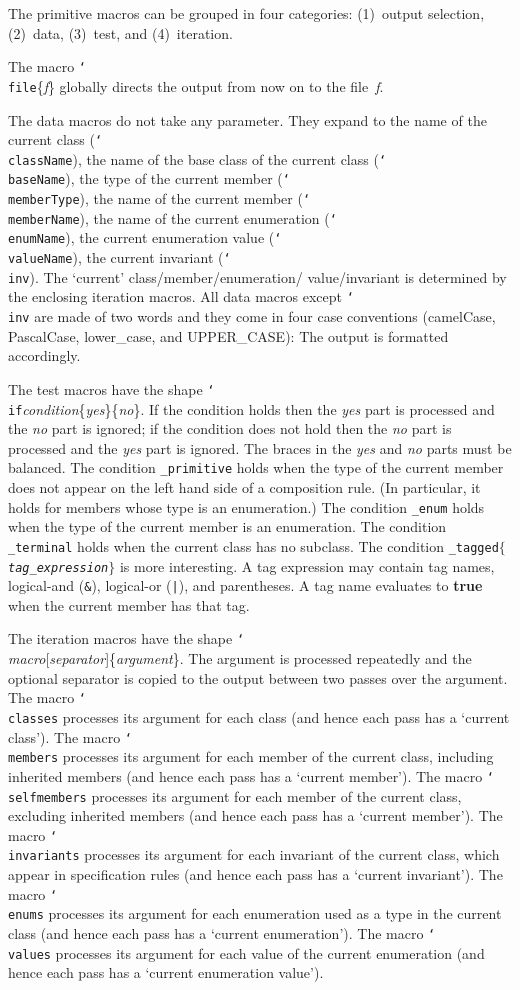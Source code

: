 \documentclass[a4paper]{article}
\newcommand{\macro}[1]{\texttt{\char`\\#1}}
\theoremstyle{slanted}
\theoremstyle{definition}
\theoremstyle{remark}
\begin{document}
The primitive macros can be grouped in four categories:
(1)~output selection, (2)~data, (3)~test, and (4)~iteration.

The macro \macro{file}\{\thinspace\textit{f}\} globally directs
the output from now on to the file~\textit{f}.

The data macros do not take any parameter. They expand to the
name of the current class (\macro{className}), the name of the
base class of the current class (\macro{baseName}), the type
of the current member (\macro{memberType}), the name of the
current member (\macro{memberName}), the name of the current
enumeration (\macro{enumName}), the current enumeration value
(\macro{valueName}), the current invariant (\macro{inv}).
The `current' class\slash member\slash enumeration\slash
value\slash invariant is determined by the enclosing iteration
macros. All data macros except \macro{inv} are made of two
words and they come in four case conventions (camelCase,
PascalCase, lower\_case, and UPPER\_CASE): The output is
formatted accordingly.

The test macros have the shape
\macro{if}\textit{condition}\{\textit{yes}\}\{\textit{no}\}.
If the condition holds then the \textit{yes} part is processed
and the \textit{no} part is ignored; if the condition does not
hold then the \textit{no} part is processed and the \textit{yes}
part is ignored. The braces in the \textit{yes} and \textit{no}
parts must be balanced. The condition \texttt{\_primitive}
holds when the type of the current member does not appear on
the left hand side of a composition rule. (In particular,
it holds for members whose type is an enumeration.) The
condition \texttt{\_enum} holds when the type of the current
member is an enumeration. The condition \texttt{\_terminal}
holds when the current class has no subclass. The condition
\texttt{\_tagged$\{$\textrm{\textit{tag\_expression}}$\}$}
is more interesting. A tag expression may contain tag names,
logical-and (\texttt{\&}), logical-or (\texttt{|}), and
parentheses. A tag name evaluates to \textbf{true} when the current
member has that tag.

The iteration macros have the shape
\macro{}\textit{macro}[\textit{separator}]\{\textit{argument}\}.
The argument is processed repeatedly and the optional separator
is copied to the output between two passes over the argument. The
macro \macro{classes} processes its argument for each class (and
hence each pass has a `current class'). The macro \macro{members}
processes its argument for each member of the current class,
including inherited members (and hence each pass has a `current
member'). The macro \macro{selfmembers} processes its argument
for each member of the current class, excluding inherited
members (and hence each pass has a `current member'). The macro
\macro{invariants} processes its argument for each invariant of
the current class, which appear in specification rules (and hence
each pass has a `current invariant'). The macro \macro{enums}
processes its argument for each enumeration used as a type in the
current class (and hence each pass has a `current enumeration').
The macro \macro{values} processes its argument for each value
of the current enumeration (and hence each pass has a `current
enumeration value').
\end{document}
